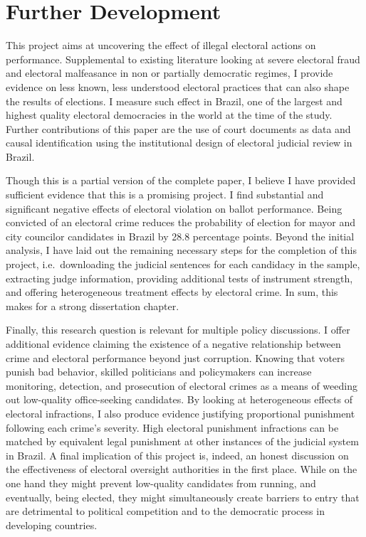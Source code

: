 \documentclass[11pt]{article}
\begin{document}
\section{Further Development} \label{sec:conclusion_paper1}

This project aims at uncovering the effect of illegal electoral actions on performance. Supplemental to existing literature looking at severe electoral fraud and electoral malfeasance in non or partially democratic regimes, I provide evidence on less known, less understood electoral practices that can also shape the results of elections. I measure such effect in Brazil, one of the largest and highest quality electoral democracies in the world at the time of the study. Further contributions of this paper are the use of court documents as data and causal identification using the institutional design of electoral judicial review in Brazil.

Though this is a partial version of the complete paper, I believe I have provided sufficient evidence that this is a promising project. I find substantial and significant negative effects of electoral violation on ballot performance. Being convicted of an electoral crime reduces the probability of election for mayor and city councilor candidates in Brazil by 28.8 percentage points. Beyond the initial analysis, I have laid out the remaining necessary steps for the completion of this project, i.e.~downloading the judicial sentences for each candidacy in the sample, extracting judge information, providing additional tests of instrument strength, and offering heterogeneous treatment effects by electoral crime. In sum, this makes for a strong dissertation chapter.

Finally, this research question is relevant for multiple policy discussions. I offer additional evidence claiming the existence of a negative relationship between crime and electoral performance beyond just corruption. Knowing that voters punish bad behavior, skilled politicians and policymakers can increase monitoring, detection, and prosecution of electoral crimes as a means of weeding out low-quality office-seeking candidates. By looking at heterogeneous effects of electoral infractions, I also produce evidence justifying proportional punishment following each crime's severity. High electoral punishment infractions can be matched by equivalent legal punishment at other instances of the judicial system in Brazil. A final implication of this project is, indeed, an honest discussion on the effectiveness of electoral oversight authorities in the first place. While on the one hand they might prevent low-quality candidates from running, and eventually, being elected, they might simultaneously create barriers to entry that are detrimental to political competition and to the democratic process in developing countries.
\end{document}
